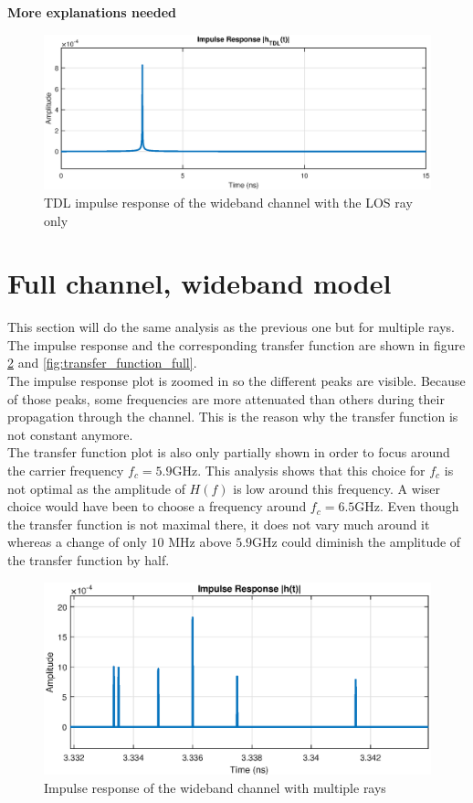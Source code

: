 \documentclass[10pt,a4paper]{ULBreport}
\begin{document}
\vspace{0.5cm}
\Large \textbf{More explanations needed}
\normalsize\\

\begin{figure}[H]
    \centering
    \includegraphics[width=1\textwidth]{4_2.eps}
    \caption{TDL impulse response of the wideband channel with the LOS ray only}
    \label{fig:h_TDL_LOS}
\end{figure}

\section{Full channel, wideband model}

This section will do the same analysis as the previous one but for multiple rays. The impulse response and the corresponding transfer function are shown in figure \ref{fig:impulse_response_full} and \ref{fig:transfer_function_full}. \\
The impulse response plot is zoomed in so the different peaks are visible. Because of those peaks, some frequencies are more attenuated than others during their propagation through the channel. This is the reason why the transfer function is not constant anymore. \\
The transfer function plot is also only partially shown in order to focus around the carrier frequency $f_c = 5.9$GHz. This analysis shows that this choice for $f_c$ is not optimal as the amplitude of $H(f)$ is low around this frequency. A wiser choice would have been to choose a frequency around $f_c = 6.5$GHz. Even though the transfer function is not maximal there, it does not vary much around it whereas a change of only $10$ MHz above $5.9$GHz could diminish the amplitude of the transfer function by half.

\begin{figure}[H]
    \centering
    \includegraphics[width=1\textwidth]{5_1.eps}
    \caption{Impulse response of the wideband channel with multiple rays}
    \label{fig:impulse_response_full}
\end{figure}
\end{document}
